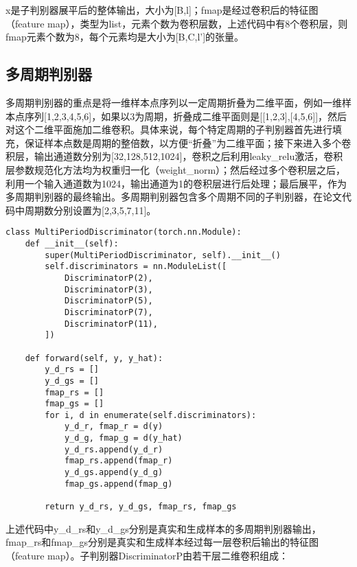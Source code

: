 \documentclass[cn,10pt,math=newtx,citestyle=gb7714-2015,bibstyle=gb7714-2015]{elegantbook}
\begin{document}
x是子判别器展平后的整体输出，大小为[B,l]；fmap是经过卷积后的特征图（feature map），类型为list，元素个数为卷积层数，上述代码中有8个卷积层，则fmap元素个数为8，每个元素均是大小为[B,C,l']的张量。

\subsection{多周期判别器}

多周期判别器的重点是将一维样本点序列以一定周期折叠为二维平面，例如一维样本点序列[1,2,3,4,5,6]，如果以3为周期，折叠成二维平面则是[[1,2,3],[4,5,6]]，然后对这个二维平面施加二维卷积。具体来说，每个特定周期的子判别器首先进行填充，保证样本点数是周期的整倍数，以方便“折叠”为二维平面；接下来进入多个卷积层，输出通道数分别为[32,128,512,1024]，卷积之后利用leaky\_relu激活，卷积层参数规范化方法均为权重归一化（weight\_norm）；然后经过多个卷积层之后，利用一个输入通道数为1024，输出通道为1的卷积层进行后处理；最后展平，作为多周期判别器的最终输出。多周期判别器包含多个周期不同的子判别器，在论文代码中周期数分别设置为[2,3,5,7,11]。

\begin{lstlisting}
class MultiPeriodDiscriminator(torch.nn.Module):
    def __init__(self):
        super(MultiPeriodDiscriminator, self).__init__()
        self.discriminators = nn.ModuleList([
            DiscriminatorP(2),
            DiscriminatorP(3),
            DiscriminatorP(5),
            DiscriminatorP(7),
            DiscriminatorP(11),
        ])

    def forward(self, y, y_hat):
        y_d_rs = []
        y_d_gs = []
        fmap_rs = []
        fmap_gs = []
        for i, d in enumerate(self.discriminators):
            y_d_r, fmap_r = d(y)
            y_d_g, fmap_g = d(y_hat)
            y_d_rs.append(y_d_r)
            fmap_rs.append(fmap_r)
            y_d_gs.append(y_d_g)
            fmap_gs.append(fmap_g)

        return y_d_rs, y_d_gs, fmap_rs, fmap_gs
\end{lstlisting}

上述代码中y\_d\_rs和y\_d\_gs分别是真实和生成样本的多周期判别器输出，fmap\_rs和fmap\_gs分别是真实和生成样本经过每一层卷积后输出的特征图（feature map）。子判别器DiscriminatorP由若干层二维卷积组成：
\end{document}

